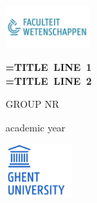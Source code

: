 \newcommand{\titlelineone}{Title line 1}
\newcommand{\titlelinetwo}{Title Line 2}
\author{Authors }
\date{25 May 2020}
\newcommand{\group}{group nr}
\newcommand{\academicyear}{academic year}

\newcommand\dunderline[3][-1pt]{{%
  \setbox0=\hbox{#3}
  \ooalign{\copy0\cr\rule[\dimexpr#1-#2\relax]{\wd0}{#2}}}}
  
\newcommand{\toupper}[1]{\expandafter\MakeUppercase
                           \expandafter{#1}}


\makeatletter
\begin{titlepage}
\includegraphics[width=0.24\textwidth]{assets/logo-fwe-nl.png}

\vspace*{\fill}

\vspace*{2cm}
\Huge
\color{ghent-university-blue}
\hspace*{-0.1cm}\textbf{\dunderline[-3pt]{3pt}{\toupper{\titlelineone}}}\\
\hspace*{-0.1cm}\textbf{\dunderline[-3pt]{3pt}{\toupper{\titlelinetwo}}}

    
\vspace{1cm}

\huge
\toupper{\group}

\vspace{4cm}

\color{black}
\LARGE
\@author

\vspace{0.6cm}

\large
\academicyear

\normalsize
\vspace*{\fill}

            
   \includegraphics[width=0.19\textwidth]{assets/logo-ugent.png}
\end{titlepage}
\makeatother
\restoregeometry
